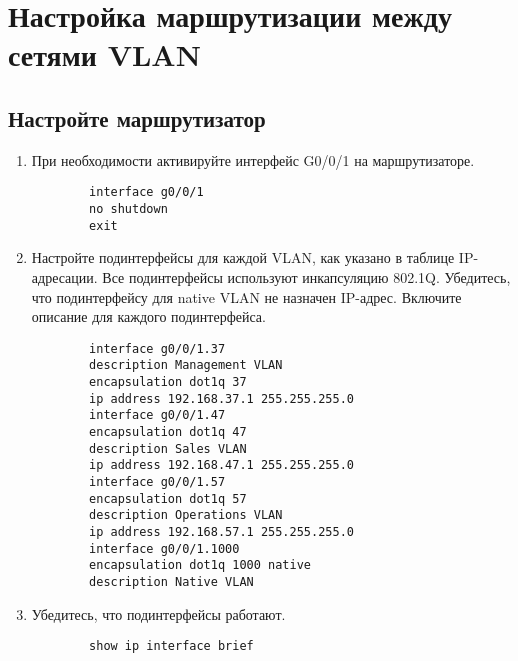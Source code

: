\section{Настройка маршрутизации между сетями VLAN}
\subsection{Настройте маршрутизатор}
\begin{enumerate}[a]
    \item При необходимости активируйте интерфейс G0/0/1 на маршрутизаторе.
    \begin{verbatim}
        interface g0/0/1
        no shutdown
        exit
    \end{verbatim}

    \item Настройте подинтерфейсы для каждой VLAN, как указано в таблице IP-адресации.
    Все подинтерфейсы используют инкапсуляцию 802.1Q\@.
    Убедитесь, что подинтерфейсу для native VLAN не назначен IP-адрес.
    Включите описание для каждого подинтерфейса.

    \begin{verbatim}
        interface g0/0/1.37
        description Management VLAN
        encapsulation dot1q 37
        ip address 192.168.37.1 255.255.255.0
        interface g0/0/1.47
        encapsulation dot1q 47
        description Sales VLAN
        ip address 192.168.47.1 255.255.255.0
        interface g0/0/1.57
        encapsulation dot1q 57
        description Operations VLAN
        ip address 192.168.57.1 255.255.255.0
        interface g0/0/1.1000
        encapsulation dot1q 1000 native
        description Native VLAN
    \end{verbatim}

    \item Убедитесь, что подинтерфейсы работают.
    \begin{verbatim}
        show ip interface brief
    \end{verbatim}
\end{enumerate}
